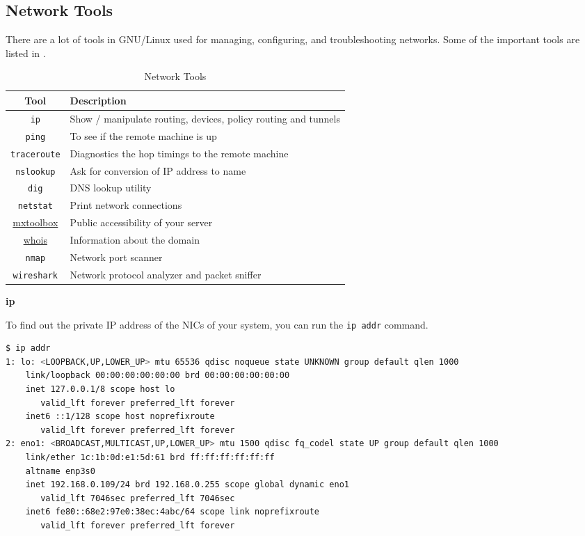 \subsection{Network Tools}

There are a lot of tools in GNU/Linux used for managing,
configuring, and troubleshooting networks. Some of the
important tools are listed in .

\begin{table*}[h!]
  \caption{Network Tools}
  \begin{tabular}{c l}
    \toprule
    \textbf{Tool} & \textbf{Description} \\
    \midrule
    \lstinline|ip| & Show / manipulate routing, devices, policy routing and tunnels \\
    \lstinline|ping| & To see if the remote machine is up \\
    \lstinline|traceroute| & Diagnostics the hop timings to the remote machine \\
    \lstinline|nslookup| & Ask for conversion of IP address to name \\
    \lstinline|dig| & DNS lookup utility \\
    \lstinline|netstat| & Print network connections \\
    \href{https://mxtoolbox.com/}{mxtoolbox} & Public accessibility of your server \\
    \href{https://whois.com/}{whois} & Information about the domain \\
    \lstinline|nmap| & Network port scanner \\
    \lstinline|wireshark| & Network protocol analyzer and packet sniffer \\
    \bottomrule
  \end{tabular}
\end{table*}

\textbf{ip}

To find out the private IP address of the NICs of your system,
you can run the \lstinline|ip addr| command.

\begin{lstlisting}[language=bash]
$ ip addr
1: lo: <LOOPBACK,UP,LOWER_UP> mtu 65536 qdisc noqueue state UNKNOWN group default qlen 1000
    link/loopback 00:00:00:00:00:00 brd 00:00:00:00:00:00
    inet 127.0.0.1/8 scope host lo
       valid_lft forever preferred_lft forever
    inet6 ::1/128 scope host noprefixroute
       valid_lft forever preferred_lft forever
2: eno1: <BROADCAST,MULTICAST,UP,LOWER_UP> mtu 1500 qdisc fq_codel state UP group default qlen 1000
    link/ether 1c:1b:0d:e1:5d:61 brd ff:ff:ff:ff:ff:ff
    altname enp3s0
    inet 192.168.0.109/24 brd 192.168.0.255 scope global dynamic eno1
       valid_lft 7046sec preferred_lft 7046sec
    inet6 fe80::68e2:97e0:38ec:4abc/64 scope link noprefixroute
       valid_lft forever preferred_lft forever
\end{lstlisting}

